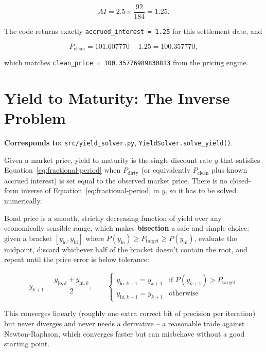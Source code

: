 \documentclass[11pt]{article}
\begin{document}
\[
  AI = 2.5 \times \frac{92}{184} = 1.25.
\]

The code returns exactly \texttt{accrued\_interest = 1.25} for this settlement date, and

\[
  P_{\text{clean}} = 101.607770 - 1.25 = 100.357770,
\]

which matches \texttt{clean\_price = 100.35776989830813} from the pricing engine.

\section{Yield to Maturity: The Inverse Problem}
\label{sec:ytm}

\textbf{Corresponds to:} \texttt{src/yield\_solver.py}, \texttt{YieldSolver.solve\_yield()}.

Given a market price, yield to maturity is the single discount rate $y$ that satisfies
Equation~\ref{eq:fractional-period} when $P_{\text{dirty}}$ (or equivalently $P_{\text{clean}}$
plus known accrued interest) is set equal to the observed market price. There is no closed-form
inverse of Equation~\ref{eq:fractional-period} in $y$, so it has to be solved numerically.

Bond price is a smooth, strictly decreasing function of yield over any economically sensible
range, which makes \textbf{bisection} a safe and simple choice: given a bracket $[y_{\text{lo}},
y_{\text{hi}}]$ where $P(y_{\text{lo}}) \geq P_{\text{target}} \geq P(y_{\text{hi}})$, evaluate
the midpoint, discard whichever half of the bracket doesn't contain the root, and repeat until
the price error is below tolerance:

\begin{equation}
  y_{k+1} = \frac{y_{\text{lo},k} + y_{\text{hi},k}}{2}, \qquad
  \begin{cases}
    y_{\text{lo},k+1} = y_{k+1} & \text{if } P(y_{k+1}) > P_{\text{target}} \\
    y_{\text{hi},k+1} = y_{k+1} & \text{otherwise}
  \end{cases}
\end{equation}

This converges linearly (roughly one extra correct bit of precision per iteration) but never
diverges and never needs a derivative -- a reasonable trade against Newton-Raphson, which
converges faster but can misbehave without a good starting point.
\end{document}
